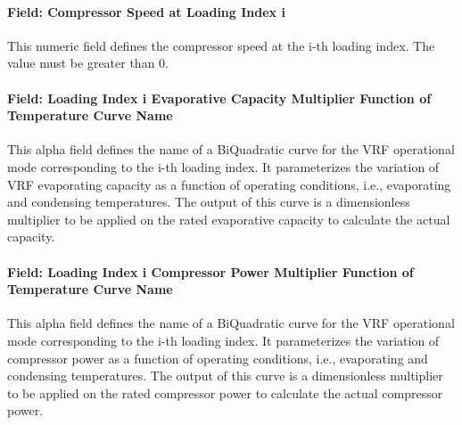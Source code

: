 \paragraph{Field: Compressor Speed at Loading Index i}\label{field-compressor-speed-at-loading-index-i}

This numeric field defines the compressor speed at the i-th loading index. The value must be greater than 0.

\paragraph{Field: Loading Index i Evaporative Capacity Multiplier Function of Temperature Curve Name}\label{field-loading-index-i-evaporative-capacity-multiplier-function-of-temperature-curve-name}

This alpha field defines the name of a BiQuadratic curve for the VRF operational mode corresponding to the i-th loading index. It parameterizes the variation of VRF evaporating capacity as a function of operating conditions, i.e., evaporating and condensing temperatures. The output of this curve is a dimensionless multiplier to be applied on the rated evaporative capacity to calculate the actual capacity.

\paragraph{Field: Loading Index i Compressor Power Multiplier Function of Temperature Curve Name}\label{field-loading-index-i-compressor-power-multiplier-function-of-temperature-curve-name}

This alpha field defines the name of a BiQuadratic curve for the VRF operational mode corresponding to the i-th loading index. It parameterizes the variation of compressor power as a function of operating conditions, i.e., evaporating and condensing temperatures. The output of this curve is a dimensionless multiplier to be applied on the rated compressor power to calculate the actual compressor power.


